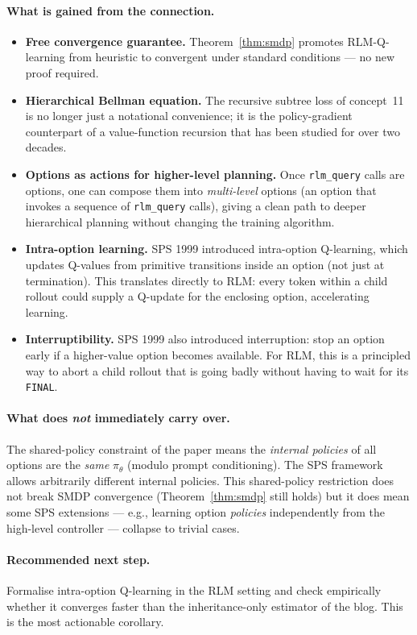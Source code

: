 \documentclass[11pt]{article}
\begin{document}
\paragraph{What is gained from the connection.}
\begin{itemize}
\item \textbf{Free convergence guarantee.} Theorem~\ref{thm:smdp} promotes
      RLM-Q-learning from heuristic to convergent under standard conditions ---
      no new proof required.
\item \textbf{Hierarchical Bellman equation.} The recursive subtree loss of
      concept~11 is no longer just a notational convenience; it is the
      policy-gradient counterpart of a value-function recursion that has been
      studied for over two decades.
\item \textbf{Options as actions for higher-level planning.} Once
      \texttt{rlm\_query} calls are options, one can compose them into
      \emph{multi-level} options (an option that invokes a sequence of
      \texttt{rlm\_query} calls), giving a clean path to deeper hierarchical
      planning without changing the training algorithm.
\item \textbf{Intra-option learning.} SPS 1999 introduced intra-option
      Q-learning, which updates Q-values from primitive transitions inside an
      option (not just at termination). This translates directly to RLM:
      every token within a child rollout could supply a Q-update for the
      enclosing option, accelerating learning.
\item \textbf{Interruptibility.} SPS 1999 also introduced interruption: stop
      an option early if a higher-value option becomes available. For RLM, this
      is a principled way to abort a child rollout that is going badly without
      having to wait for its \texttt{FINAL}.
\end{itemize}

\paragraph{What does \emph{not} immediately carry over.} The shared-policy
constraint of the paper means the \emph{internal policies} of all options are
the \emph{same} $\pi_\theta$ (modulo prompt conditioning). The SPS framework
allows arbitrarily different internal policies. This shared-policy
restriction does not break SMDP convergence (Theorem~\ref{thm:smdp} still
holds) but it does mean some SPS extensions --- e.g., learning option
\emph{policies} independently from the high-level controller --- collapse to
trivial cases.

\paragraph{Recommended next step.} Formalise intra-option Q-learning in the
RLM setting and check empirically whether it converges faster than the
inheritance-only estimator of the blog. This is the most actionable corollary.
\end{document}
